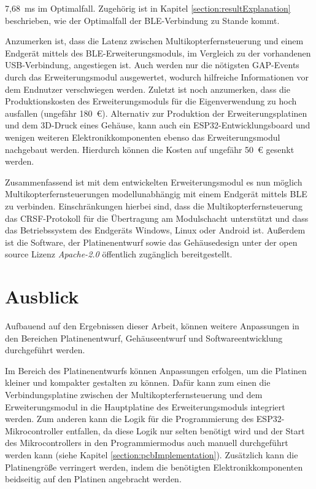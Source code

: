7,68~ms im Optimalfall. Zugehörig ist in Kapitel \ref{section:resultExplanation} beschrieben, wie der Optimalfall der \ac{BLE}-Verbindung zu Stande kommt.

Anzumerken ist, dass die Latenz zwischen Multikopterfernsteuerung und einem Endgerät mittels des \ac{BLE}-Erweiterungsmoduls, im Vergleich zu der vorhandenen USB-Verbindung, angestiegen ist. Auch werden nur die nötigsten \ac{GAP}-Events durch das Erweiterungsmodul ausgewertet, wodurch hilfreiche Informationen vor dem Endnutzer verschwiegen werden. Zuletzt ist noch anzumerken, dass die Produktionskosten des Erweiterungsmoduls für die Eigenverwendung zu hoch ausfallen (ungefähr 180~€). Alternativ zur Produktion der Erweiterungsplatinen und dem 3D-Druck eines Gehäuse, kann auch ein ESP32-Entwicklungsboard und wenigen weiteren Elektronikkomponenten ebenso das Erweiterungsmodul nachgebaut werden. Hierdurch können die Kosten auf ungefähr 50~€ gesenkt werden. 

Zusammenfassend ist mit dem entwickelten Erweiterungsmodul es nun möglich Multikopterfernsteuerungen modellunabhängig mit einem Endgerät mittels \ac{BLE} zu verbinden. Einschränkungen hierbei sind, dass die Multikopterfernsteuerung das CRSF-Protokoll für die Übertragung am Modulschacht unterstützt und dass das Betriebssystem des Endgeräts Windows, Linux oder Android ist. Außerdem ist die Software, der Platinenentwurf sowie das Gehäusedesign unter der open source Lizenz \textit{Apache-2.0} öffentlich zugänglich bereitgestellt.

\section{Ausblick}
Aufbauend auf den Ergebnissen dieser Arbeit, können weitere Anpassungen in den Bereichen Platinenentwurf, Gehäuseentwurf und Softwareentwicklung durchgeführt werden.

Im Bereich des Platinenentwurfs können Anpassungen erfolgen, um die Platinen kleiner und kompakter gestalten zu können. Dafür kann zum einen die Verbindungsplatine zwischen der Multikopterfernsteuerung und dem Erweiterungsmodul in die Hauptplatine des Erweiterungsmoduls integriert werden. Zum anderen kann die Logik für die Programmierung des ESP32-Mikrocontroller entfallen, da diese Logik nur selten benötigt wird und der Start des Mikrocontrollers in den Programmiermodus auch manuell durchgeführt werden kann (siehe Kapitel \ref{section:pcbImplementation}). Zusätzlich kann die Platinengröße verringert werden, indem die benötigten Elektronikkomponenten beidseitig auf den Platinen angebracht werden.

